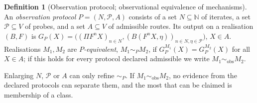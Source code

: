 \documentclass[11pt,a4paper]{article}
\theoremstyle{plain}
\theoremstyle{definition}
\newtheorem{definition}[theorem]{Definition}
\begin{document}
\begin{definition}[Observation protocol; observational equivalence of mechanisms]\label{def:protocol}
An \emph{observation protocol} $P=(N,\mathcal P,A)$ consists of a set $N\subseteq\mathbb N$ of iterates, a set $\mathcal P\subseteq V$ of probes, and a set $A\subseteq V$ of admissible routes.
Its output on a realisation $(B,F)$ is $G_P(X)=\bigl((\Pi F^nX)_{n\in N},(B(F^nX,\eta))_{n\in N,\eta\in\mathcal P}\bigr)$, $X\in A$.
Realisations $M_1,M_2$ are \emph{$P$-equivalent}, $M_1\sim_PM_2$, if $G_P^{M_1}(X)=G_P^{M_2}(X)$ for all $X\in A$; if this holds for every protocol declared admissible we write $M_1\sim_{\mathrm{obs}}M_2$.
\end{definition}
Enlarging $N$, $\mathcal P$ or $A$ can only refine $\sim_P$. If $M_1\sim_{\mathrm{obs}}M_2$, no evidence from the declared protocols can separate them, and the most that can be claimed is membership of a class.
\end{document}
